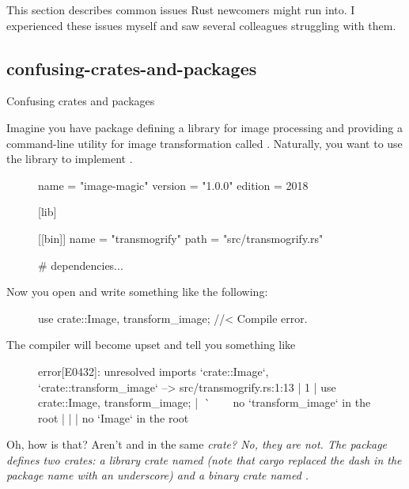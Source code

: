 \documentclass{article}
\begin{document}
This section describes common issues Rust newcomers might run into.
I experienced these issues myself and saw several colleagues struggling with them.

\subsection{confusing-crates-and-packages}{Confusing crates and packages}

Imagine you have package  defining a library for image processing and providing a command-line utility for image transformation called .
Naturally, you want to use the library to implement .

\begin{figure}
\begin{code}[good]
[package]
name = "image-magic"
version = "1.0.0"
edition = 2018

[lib]

[[bin]]
name = "transmogrify"
path = "src/transmogrify.rs"

# dependencies...
\end{code}
\end{figure}


Now you open  and write something like the following:

\begin{figure}
\begin{code}[bad]
use crate::{Image, transform_image}; //< Compile error.
\end{code}
\end{figure}

The compiler will become upset and tell you something like

\begin{figure}
    \begin{code}[bad]
error[E0432]: unresolved imports `crate::Image`, `crate::transform_image`
 --> src/transmogrify.rs:1:13
  |
1 | use crate::{Image, transform_image};
  |             ^^^^^  ^^^^^^^^^^^^^^^ no `transform_image` in the root
  |             |
  |             no `Image` in the root
\end{code}
\end{figure}


Oh, how is that?
Aren't  and  in the same \em{crate}?
No, they are not.
The  \em{package} defines two \em{crates}: a \em{library crate} named  (note that cargo replaced the dash in the package name with an underscore) and a \em{binary crate} named .
\end{document}
